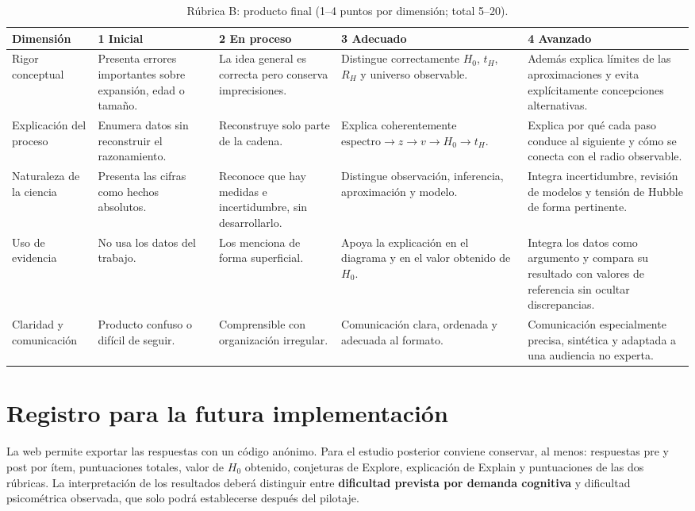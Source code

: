 \begin{table}[htbp]
\centering
\caption{Rúbrica B: producto final (1--4 puntos por dimensión; total 5--20).}\label{tab:rubricaB}
\begin{tabularx}{\textwidth}{|p{2.4cm}|X|X|X|X|}
\hline
\rowcolor{naranja}
\color{white}\textbf{Dimensión} & \color{white}\textbf{1 Inicial} & \color{white}\textbf{2 En proceso} & \color{white}\textbf{3 Adecuado} & \color{white}\textbf{4 Avanzado} \\ \hline
Rigor conceptual & Presenta errores importantes sobre expansión, edad o tamaño. & La idea general es correcta pero conserva imprecisiones. & Distingue correctamente $H_0$, $t_H$, $R_H$ y universo observable. & Además explica límites de las aproximaciones y evita explícitamente concepciones alternativas. \\ \hline
Explicación del proceso & Enumera datos sin reconstruir el razonamiento. & Reconstruye solo parte de la cadena. & Explica coherentemente $\mathrm{espectro}\rightarrow z\rightarrow v\rightarrow H_0\rightarrow t_H$. & Explica por qué cada paso conduce al siguiente y cómo se conecta con el radio observable. \\ \hline
Naturaleza de la ciencia & Presenta las cifras como hechos absolutos. & Reconoce que hay medidas e incertidumbre, sin desarrollarlo. & Distingue observación, inferencia, aproximación y modelo. & Integra incertidumbre, revisión de modelos y tensión de Hubble de forma pertinente. \\ \hline
Uso de evidencia & No usa los datos del trabajo. & Los menciona de forma superficial. & Apoya la explicación en el diagrama y en el valor obtenido de $H_0$. & Integra los datos como argumento y compara su resultado con valores de referencia sin ocultar discrepancias. \\ \hline
Claridad y comunicación & Producto confuso o difícil de seguir. & Comprensible con organización irregular. & Comunicación clara, ordenada y adecuada al formato. & Comunicación especialmente precisa, sintética y adaptada a una audiencia no experta. \\ \hline
\end{tabularx}
\end{table}

\section*{Registro para la futura implementación}

La web permite exportar las respuestas con un código anónimo. Para el estudio posterior conviene conservar, al menos: respuestas pre y post por ítem, puntuaciones totales, valor de $H_0$ obtenido, conjeturas de Explore, explicación de Explain y puntuaciones de las dos rúbricas. La interpretación de los resultados deberá distinguir entre \textbf{dificultad prevista por demanda cognitiva} y dificultad psicométrica observada, que solo podrá establecerse después del pilotaje.
